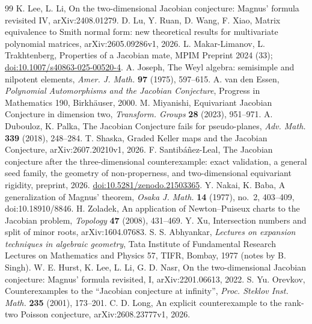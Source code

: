 \documentclass[11pt]{article}
\theoremstyle{remark}
\begin{document}
\begin{thebibliography}{99}
 K. Lee, L. Li, On the two-dimensional Jacobian conjecture:
Magnus' formula revisited IV, arXiv:2408.01279.
 D. Lu, Y. Ruan, D. Wang, F. Xiao,
Matrix equivalence to Smith normal form: new theoretical results for
multivariate polynomial matrices, arXiv:2605.09286v1, 2026.
 L. Makar-Limanov, L. Trakhtenberg,
Properties of a Jacobian mate, MPIM Preprint 2024 (33);
\href{https://doi.org/10.1007/s40863-025-00520-4}{doi:10.1007/s40863-025-00520-4}.
 A. Joseph, The Weyl algebra: semisimple and nilpotent elements,
\emph{Amer. J. Math.} \textbf{97} (1975), 597--615.
 A. van den Essen, \emph{Polynomial Automorphisms and the Jacobian
Conjecture}, Progress in Mathematics 190, Birkh\"auser, 2000.
 M. Miyanishi, Equivariant Jacobian Conjecture in dimension two,
\emph{Transform. Groups} \textbf{28} (2023), 951--971.
 A. Dubouloz, K. Palka, The Jacobian Conjecture fails for
pseudo-planes, \emph{Adv. Math.} \textbf{339} (2018), 248--284.
 T. Shaska, Graded Keller maps and the Jacobian Conjecture,
arXiv:2607.20210v1, 2026.
 F. Santib\'a\~nez-Leal, The Jacobian conjecture after the
three-dimensional counterexample: exact validation, a general seed family, the geometry of
non-properness, and two-dimensional equivariant rigidity, preprint, 2026.
\href{https://doi.org/10.5281/zenodo.21503365}{doi:10.5281/zenodo.21503365}.
 Y. Nakai, K. Baba, A generalization of Magnus' theorem, \emph{Osaka J. Math.} \textbf{14} (1977), no.~2,
403--409, doi:10.18910/8846.
 H. Zoladek, An application of Newton--Puiseux charts to the Jacobian problem,
\emph{Topology} \textbf{47} (2008), 431--469.
 Y. Xu, Intersection numbers and split of minor roots, arXiv:1604.07683.
 S. S. Abhyankar, \emph{Lectures on expansion techniques in algebraic geometry}, Tata
Institute of Fundamental Research Lectures on Mathematics and Physics 57, TIFR, Bombay, 1977 (notes by B. Singh).
 W. E. Hurst, K. Lee, L. Li, G. D. Nasr, On the two-dimensional Jacobian conjecture: Magnus' formula
revisited, I, arXiv:2201.06613, 2022.
 S. Yu. Orevkov, Counterexamples to the ``Jacobian conjecture at infinity'',
\emph{Proc. Steklov Inst. Math.} \textbf{235} (2001), 173--201.
 C. D. Long, An explicit counterexample to the rank-two Poisson conjecture, arXiv:2608.23777v1, 2026.

\end{thebibliography}
\end{document}
